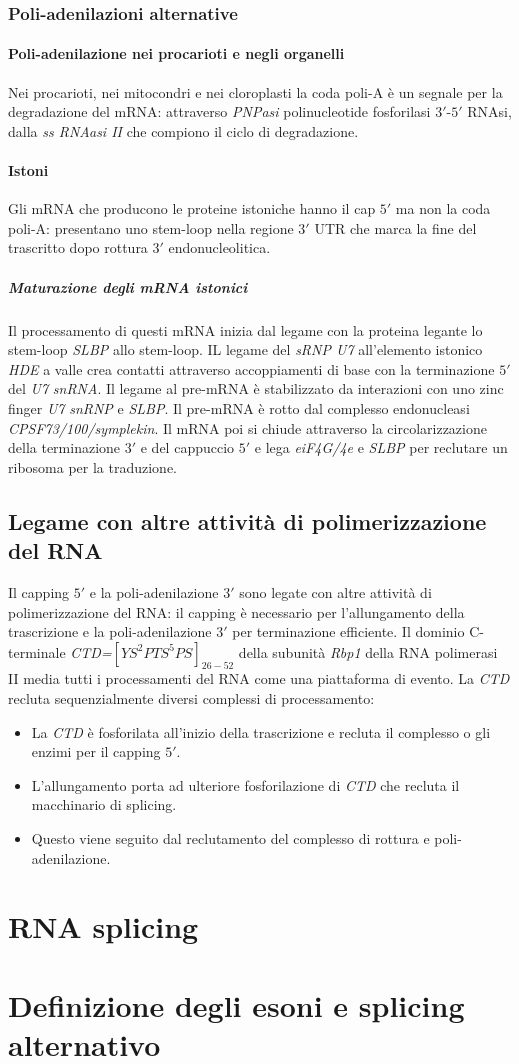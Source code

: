 \subsubsection{Poli-adenilazioni alternative}
\paragraph{Poli-adenilazione nei procarioti e negli organelli}
Nei procarioti, nei mitocondri e nei cloroplasti la coda poli-A \`e un segnale per la degradazione del mRNA: attraverso \emph{PNPasi} polinucleotide fosforilasi $3'$-$5'$ RNAsi, dalla
\emph{ss RNAasi II} che compiono il ciclo di degradazione.
\paragraph{Istoni}
Gli mRNA che producono le proteine istoniche hanno il cap $5'$ ma non la coda poli-A: presentano uno stem-loop nella regione $3'$ UTR che marca la fine del trascritto dopo rottura
$3'$ endonucleolitica. 
\subparagraph{Maturazione degli mRNA istonici}
Il processamento di questi mRNA inizia dal legame con la proteina legante lo stem-loop \emph{SLBP} allo stem-loop. IL legame del \emph{sRNP U7} all'elemento istonico \emph{HDE} a valle
crea contatti attraverso accoppiamenti di base con la terminazione $5'$ del \emph{U7} \emph{snRNA}. Il legame al pre-mRNA \`e stabilizzato da interazioni con uno zinc finger 
\emph{U7} \emph{snRNP} e \emph{SLBP}. Il pre-mRNA \`e rotto dal complesso endonucleasi \emph{CPSF73/100/symplekin}. Il mRNA poi si chiude attraverso la circolarizzazione della 
terminazione $3'$ e del cappuccio $5'$ e lega \emph{eiF4G/4e} e \emph{SLBP} per reclutare un ribosoma per la traduzione. 
\subsection{Legame con altre attivit\`a di polimerizzazione del RNA}
Il capping $5'$ e la poli-adenilazione $3'$ sono legate con altre attivit\`a di polimerizzazione del RNA: il capping \`e necessario per l'allungamento della trascrizione e la
poli-adenilazione $3'$ per terminazione efficiente. Il dominio C-terminale \emph{CTD=$[YS^2PTS^5PS]_{26-52}$} della subunit\`a \emph{Rbp1} della RNA polimerasi II media tutti i 
processamenti del RNA come una piattaforma di evento. La \emph{CTD} recluta sequenzialmente diversi complessi di processamento:
\begin{itemize}
	\item La \emph{CTD} \`e fosforilata all'inizio della trascrizione e recluta il complesso o gli enzimi per il capping $5'$. 
	\item L'allungamento porta ad ulteriore fosforilazione di \emph{CTD} che recluta il macchinario di splicing.
	\item Questo viene seguito dal reclutamento del complesso di rottura e poli-adenilazione.
\end{itemize}
\section{RNA splicing}

\section{Definizione degli esoni e splicing alternativo}

